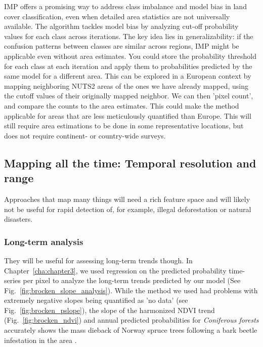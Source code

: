         IMP offers a promising way to address class imbalance and model bias in land cover classification, even when detailed area statistics are not universally available. The algorithm tackles model bias by analyzing cut-off probability values for each class across iterations. The key idea lies in generalizability: if the confusion patterns between classes are similar across regions, IMP might be applicable even without area estimates. You could store the probability threshold for each class at each iteration and apply them to probabilities predicted by the same model for a different area. This can be explored in a European context by mapping neighboring NUTS2 areas of the ones we have already mapped, using the cutoff values of their originally mapped neighbor. We can then 'pixel count', and compare the counts to the area estimates. This could make the method applicable for areas that are less meticulously quantified than Europe. This will still require area estimations to be done in some representative locations, but does not require continent- or country-wide surveys. 
        
    \subsection{Mapping all the time: Temporal resolution and range}
        \label{syn:allthetime}

        Approaches that map many things will need a rich feature space and will likely not be useful for rapid detection of, for example, illegal deforestation or natural disasters.

        \subsubsection{Long-term analysis}
        They will be useful for assessing long-term trends though. In Chapter\@~\ref{cha:chapter3}, we used regression on the predicted probability time-series per pixel to analyze the long-term trends predicted by our model (See Fig.\@~\ref{fig:brocken_slope_analysis}). While the method we used had problems with extremely negative slopes being quantified as 'no data' (see Fig.\@~\ref{fig:brocken_pslope}), the slope of the harmonized NDVI trend (Fig.\@~\ref{fig:brocken_ndvi}) and annual predicted probabilities for \textit{Coniferous forests} accurately shows the mass dieback of Norway spruce trees following a bark beetle infestation in the area \citep{meyer2017matter}.

